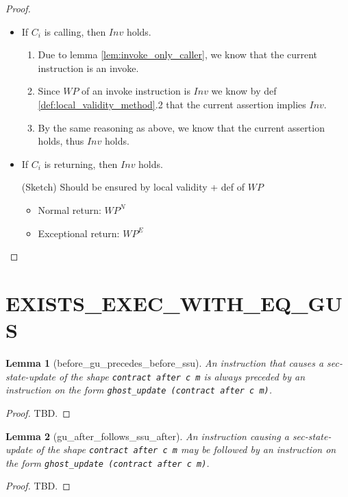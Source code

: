 \documentclass[a4paper,11pt]{article}
\newtheorem{lemma}{Lemma}
\newcommand{\Inv}{\mathit{Inv}}
\newcommand{\WP}{\mathit{WP}}
\begin{document}
{\begin{proof}
\begin{enumerate}
\begin{description}
\begin{itemize}
    \item If $C_i$ is calling, then $\Inv$ holds.
      \begin{enumerate}
      \item Due to lemma \ref{lem:invoke_only_caller}, we know that the current instruction is an invoke.
      \item Since $\WP$ of an invoke instruction is $\Inv$ we know by def \ref{def:local_validity_method}.2 that the current assertion implies $\Inv$.
      \item By the same reasoning as above, we know that the current assertion holds, thus $\Inv$ holds.
      \end{enumerate}
    \item If $C_i$ is returning, then $\Inv$ holds.

      (Sketch) Should be ensured by local validity + def of $\WP$
      
      \begin{itemize}
      \item Normal return: $\WP^N$
      \item Exceptional return: $\WP^E$
      \end{itemize}
      
      
    \end{itemize}
    
  \end{description}
\end{enumerate}
\end{proof}
}


\newpage
\section{EXISTS\_EXEC\_WITH\_EQ\_GUS}
\newcommand{\ssus}{\mathit{ssus}}
\newcommand{\gus}{\mathit{gus}}
\newcommand{\sst}{\mathit{sst}}
\renewcommand{\ss}{\mathit{ss}}
\newcommand{\gv}{\mathit{gv}}
\newcommand{\pref}{\mathit{pref}}

\begin{lemma}[before\_gu\_precedes\_before\_ssu]\label{lem:before_gu_precedes_before_ssu}
An instruction that causes a sec-state-update of the shape {\tt contract after c m} is always preceded by an instruction on the form {\tt ghost\_update (contract after c m)}.
\end{lemma}
\begin{proof}
TBD.
\end{proof}


\begin{lemma}[gu\_after\_follows\_ssu\_after]\label{lem:gu_after_follows_ssu_after}
An instruction causing a sec-state-update of the shape {\tt contract after c m} may be followed by an instruction on the form {\tt ghost\_update (contract after c m)}.
\end{lemma}
\begin{proof}
TBD.
\end{proof}
\end{document}
